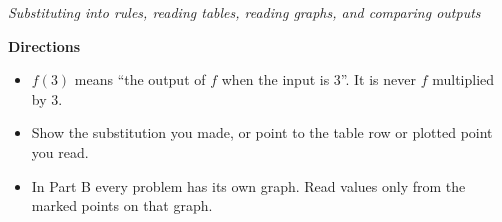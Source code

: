 \documentclass[12pt]{article}
\begin{document}

\begin{center}
\textit{Substituting into rules, reading tables, reading graphs, and comparing outputs}
\end{center}

\vspace{0.15cm}
\noindent\textbf{Directions}
\begin{itemize}[leftmargin=0.9cm, itemsep=1pt, topsep=2pt]
  \item $f(3)$ means ``the output of $f$ when the input is $3$''. It is never $f$ multiplied by $3$.
  \item Show the substitution you made, or point to the table row or plotted point you read.
  \item In Part B every problem has its own graph. Read values only from the marked points on that graph.
\end{itemize}
\end{document}

